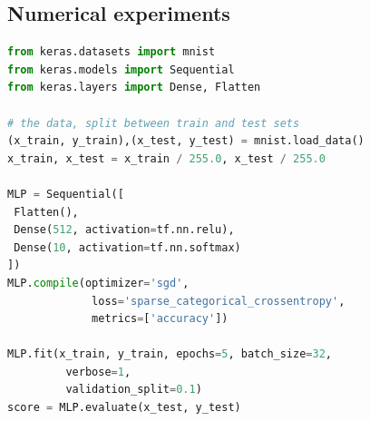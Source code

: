 \subsection{Numerical experiments}

\begin{lstlisting}[language=Python]
from keras.datasets import mnist
from keras.models import Sequential
from keras.layers import Dense, Flatten

# the data, split between train and test sets
(x_train, y_train),(x_test, y_test) = mnist.load_data()
x_train, x_test = x_train / 255.0, x_test / 255.0

MLP = Sequential([
 Flatten(),
 Dense(512, activation=tf.nn.relu),
 Dense(10, activation=tf.nn.softmax)
])
MLP.compile(optimizer='sgd',
             loss='sparse_categorical_crossentropy',
             metrics=['accuracy'])

MLP.fit(x_train, y_train, epochs=5, batch_size=32,
         verbose=1,
         validation_split=0.1)
score = MLP.evaluate(x_test, y_test)
\end{lstlisting}



